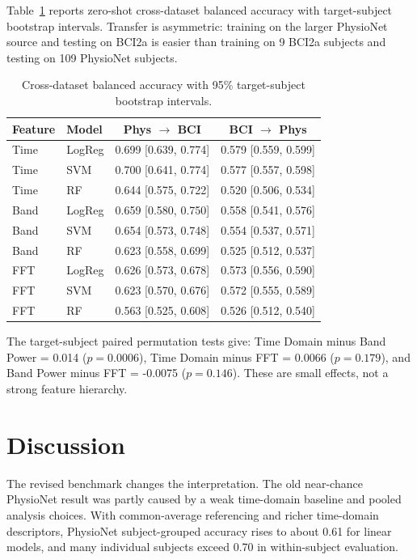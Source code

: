 \documentclass[10pt,twocolumn]{article}
\begin{document}
Table~\ref{tab:cross} reports zero-shot cross-dataset balanced accuracy with
target-subject bootstrap intervals. Transfer is asymmetric: training on the
larger PhysioNet source and testing on BCI2a is easier than training on 9
BCI2a subjects and testing on 109 PhysioNet subjects.

\begin{table}[t]
\centering
\caption{Cross-dataset balanced accuracy with 95\% target-subject bootstrap
  intervals.}
\label{tab:cross}
\footnotesize
\setlength{\tabcolsep}{4pt}
\begin{tabular}{@{}llcc@{}}
\toprule
Feature & Model & Phys $\to$ BCI & BCI $\to$ Phys \\
\midrule
Time & LogReg & 0.699 {[}0.639, 0.774{]} & 0.579 {[}0.559, 0.599{]} \\
Time & SVM    & 0.700 {[}0.641, 0.774{]} & 0.577 {[}0.557, 0.598{]} \\
Time & RF     & 0.644 {[}0.575, 0.722{]} & 0.520 {[}0.506, 0.534{]} \\
\midrule
Band & LogReg & 0.659 {[}0.580, 0.750{]} & 0.558 {[}0.541, 0.576{]} \\
Band & SVM    & 0.654 {[}0.573, 0.748{]} & 0.554 {[}0.537, 0.571{]} \\
Band & RF     & 0.623 {[}0.558, 0.699{]} & 0.525 {[}0.512, 0.537{]} \\
\midrule
FFT  & LogReg & 0.626 {[}0.573, 0.678{]} & 0.573 {[}0.556, 0.590{]} \\
FFT  & SVM    & 0.623 {[}0.570, 0.676{]} & 0.572 {[}0.555, 0.589{]} \\
FFT  & RF     & 0.563 {[}0.525, 0.608{]} & 0.526 {[}0.512, 0.540{]} \\
\bottomrule
\end{tabular}
\end{table}

The target-subject paired permutation tests give: Time Domain minus Band Power
= 0.014 ($p=0.0006$), Time Domain minus FFT = 0.0066 ($p=0.179$), and Band
Power minus FFT = -0.0075 ($p=0.146$). These are small effects, not a strong
feature hierarchy.

\section{Discussion}
The revised benchmark changes the interpretation. The old near-chance
PhysioNet result was partly caused by a weak time-domain baseline and pooled
analysis choices. With common-average referencing and richer time-domain
descriptors, PhysioNet subject-grouped accuracy rises to about 0.61 for linear
models, and many individual subjects exceed 0.70 in within-subject evaluation.
\end{document}
